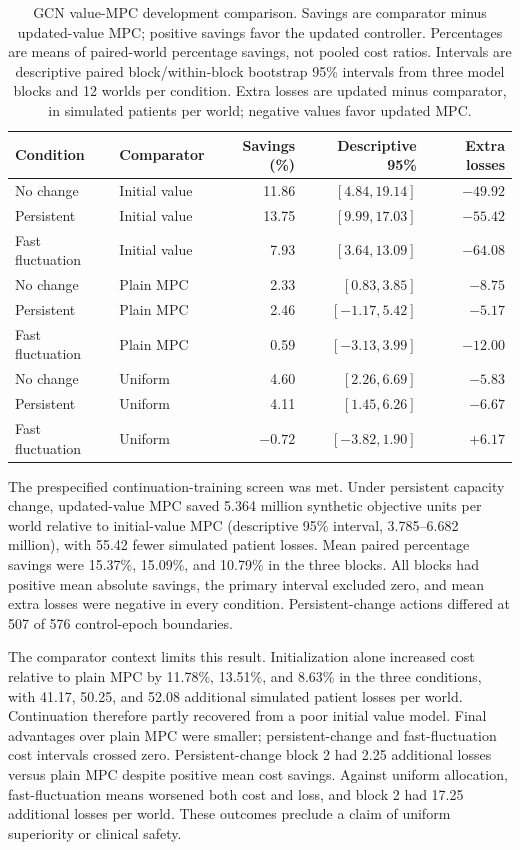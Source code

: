 \documentclass[preprint,review,12pt]{elsarticle}
\begin{document}
\begin{table}[htbp]
\centering
\small
\caption{GCN value-MPC development comparison. Savings are comparator minus
updated-value MPC; positive savings favor the updated controller. Percentages
are means of paired-world percentage savings, not pooled cost ratios. Intervals
are descriptive paired block/within-block bootstrap 95\% intervals from three
model blocks and 12 worlds per condition. Extra losses are updated minus
comparator, in simulated patients per world; negative values favor updated MPC.}
\label{tab:value-mpc-development}
\setlength{\tabcolsep}{3pt}
\begin{tabularx}{\textwidth}{@{}lXrrr@{}}
\toprule
Condition & Comparator & Savings (\%) & Descriptive 95\% & Extra losses \\
\midrule
No change & Initial value & 11.86 & $[4.84,19.14]$ & $-49.92$ \\
Persistent & Initial value & 13.75 & $[9.99,17.03]$ & $-55.42$ \\
Fast fluctuation & Initial value & 7.93 & $[3.64,13.09]$ & $-64.08$ \\
No change & Plain MPC & 2.33 & $[0.83,3.85]$ & $-8.75$ \\
Persistent & Plain MPC & 2.46 & $[-1.17,5.42]$ & $-5.17$ \\
Fast fluctuation & Plain MPC & 0.59 & $[-3.13,3.99]$ & $-12.00$ \\
No change & Uniform & 4.60 & $[2.26,6.69]$ & $-5.83$ \\
Persistent & Uniform & 4.11 & $[1.45,6.26]$ & $-6.67$ \\
Fast fluctuation & Uniform & $-0.72$ & $[-3.82,1.90]$ & $+6.17$ \\
\bottomrule
\end{tabularx}
\end{table}

The prespecified continuation-training screen was met. Under persistent
capacity change, updated-value MPC saved 5.364 million synthetic objective
units per world relative to initial-value MPC (descriptive 95\% interval,
3.785--6.682 million), with 55.42 fewer simulated patient losses. Mean paired
percentage savings were 15.37\%, 15.09\%, and 10.79\% in the three blocks.
All blocks had positive mean absolute savings, the primary interval excluded
zero, and mean extra losses were negative in every condition. Persistent-change
actions differed at 507 of 576 control-epoch boundaries.

The comparator context limits this result. Initialization alone increased cost
relative to plain MPC by 11.78\%, 13.51\%, and 8.63\% in the three conditions,
with 41.17, 50.25, and 52.08 additional simulated patient losses per world.
Continuation therefore partly recovered from a poor initial value model.
Final advantages over plain MPC were smaller; persistent-change and
fast-fluctuation cost intervals crossed zero. Persistent-change block 2 had
2.25 additional losses versus plain MPC despite positive mean cost savings.
Against uniform allocation, fast-fluctuation means worsened both cost and loss,
and block 2 had 17.25 additional losses per world. These outcomes preclude a
claim of uniform superiority or clinical safety.
\end{document}
